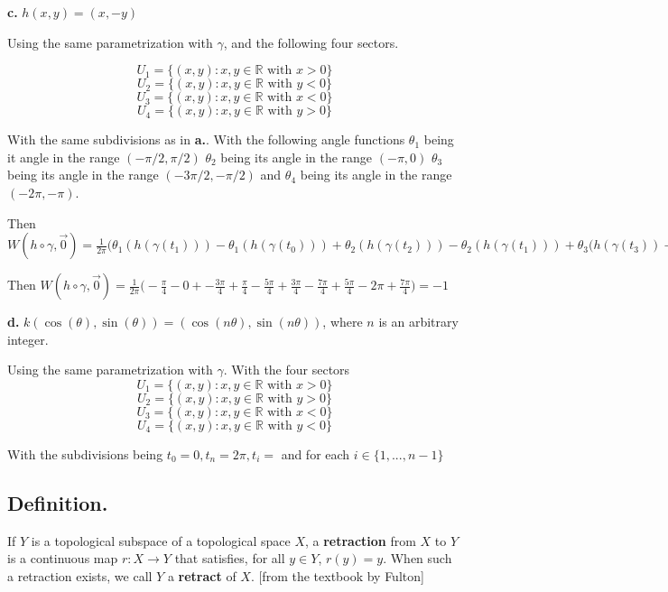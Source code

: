 \documentclass{amsart}
\theoremstyle{plain}
\theoremstyle{definition}
\theoremstyle{remark}
\begin{document}
\vspace{.1in}
{\bfseries c.} $h(x,y) = (x,-y)$


Using the same parametrization with $\gamma$, and the following four sectors. 


$$U_1=\{(x,y): x,y \in \mathbb R \text { with }x>0\}$$
$$U_2=\{(x,y): x,y \in \mathbb R \text { with }y<0\}$$
$$U_3=\{(x,y):x,y\in \mathbb R \text { with } x<0\}$$
$$U_4=\{(x,y):x,y\in \mathbb R \text { with }y>0\}$$

With the same subdivisions as in {\bfseries a.}. With the following angle functions $\theta_1$ being it angle in the range $(-\pi/2,\pi /2)$ $\theta_2$ being its angle in the range $( -\pi,0)$ $\theta_3$ being its angle in the range $(-3\pi/2,-\pi/2)$ and $\theta_4$ being its angle in the range $(-2\pi,-\pi)$. 


Then $W(h\circ \gamma , \vec 0)=\frac{1}{2\pi}\big(\theta_1(h(\gamma(t_1)))-\theta_1(h(\gamma(t_0)))+\theta_2(h(\gamma(t_2)))-\theta_2(h(\gamma(t_1)))+\theta_3(h(\gamma(t_3))-\theta_3(h(\gamma(t_2)))+\theta_4(h(\gamma(t_4)))-\theta_4(h(\gamma(t_3)))+\theta_1(h(\gamma(t_5)))-\theta_1(h(\gamma(t_4))) \big)$

Then $W(h\circ \gamma,\vec 0)=\frac{1}{2\pi}\big( -\frac{\pi}{4} - 0+ -\frac{3\pi}{4}+\frac{\pi}{4}-\frac{5\pi}{4}+\frac{3\pi}{4}-\frac{7\pi}{4}+\frac{5\pi}{4}-2\pi+\frac{7\pi}{4} \big)=-1$


\vspace{.1in}
{\bfseries d.} $k(\cos (\theta ), \sin (\theta )) = (\cos (n\theta ), \sin (n\theta ))$, where $n$ is an arbitrary integer.
{
    Using the same parametrization with $\gamma$. With the four sectors $$U_1=\{(x,y):x,y\in \mathbb{R}\text{ with }x>0\}$$
    $$U_2=\{(x,y):x,y\in \mathbb{R}\text{ with }y>0\}$$
    $$U_3=\{(x,y):x,y\in \mathbb{R}\text{ with }x<0\}$$
    $$U_4=\{(x,y):x,y\in \mathbb{R}\text{ with }y<0\}$$

    With the subdivisions being $t_0=0,t_{n}=2\pi,t_i=$ and for each $i\in \{1,...,n-1\}$ 



}


\vspace{.15in}
\subsection*{Definition.}  If $Y$ is a topological subspace of a topological space $X$, a {\bf retraction} from $X$ to $Y$ is a continuous map $r : X \to Y$ that satisfies, for all $y\in Y$, $r(y) = y$. When such a retraction exists, we call $Y$ a {\bf retract} of $X$. [from the textbook by Fulton]
\end{document}
